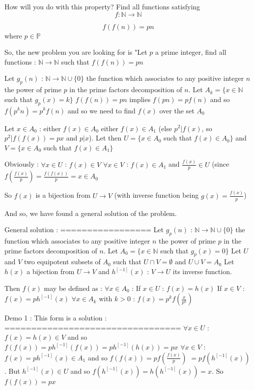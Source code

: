 \begin{solution}
	\begin{tcolorbox}How will you do with this property?
Find all functions satisfying
\[ f: \mathbb N \to \mathbb N
\]

\[ f(f(n)) = pn
\]
where $ p\in \mathbb P$\end{tcolorbox}
So, the new problem you are looking for is "Let $ p$ a prime integer, find all functions : $ \mathbb N\to\mathbb N$ such that $ f(f(n)) = pn$

Let $ g_p(n)$ : $ \mathbb N\to\mathbb N\cup\{0\}$ the function which associates to any positive integer $ n$ the power of prime $ p$ in the prime factors decomposition of $ n$.
Let $ A_k = \{x\in\mathbb N$ such that $ g_p(x) = k\}$
$ f(f(n)) = pn$ implies $ f(pn) = pf(n)$ and so $ f(p^kn) = p^kf(n)$ and so we need to find $ f(x)$ over the set $ A_0$

Let $ x\in A_0$ : either $ f(x)\in A_0$ either $ f(x)\in A_1$ (else $ p^2|f(x)$, so $ p^2|f(f(x)) = px$ and $ p|x$).
Let then $ U = \{x\in A_0$ such that $ f(x)\in A_0\}$ and $ V = \{x\in A_0$ such that $ f(x)\in A_1\}$

Obviously :
$ \forall x\in U$ : $ f(x)\in V$
$ \forall x\in V$ : $ f(x)\in A_1$ and $ \frac {f(x)}{p}\in U$ (since $ f(\frac {f(x)}{p}) = \frac {f(f(x))}{p} = x\in A_0$

So $ f(x)$ is a bijection from $ U\to V$ (with inverse function being $ g(x) = \frac {f(x)}{p}$)

And so, we have found a general solution of the problem.

General solution :
=================
Let $ g_p(n)$ : $ \mathbb N\to\mathbb N\cup\{0\}$ the function which associates to any positive integer $ n$ the power of prime $ p$ in the prime factors decomposition of $ n$.
Let $ A_0 = \{x\in\mathbb N$ such that $ g_p(x) = 0\}$
Let $ U$ and $ V$ two equipotent subsets of $ A_0$ such that $ U\cap V = \emptyset$ and $ U \cup V = A_0$
Let $ h(x)$ a bijection from $ U\to V$ and $ h^{[ - 1]}(x)$ : $ V\to U$ its inverse function.

Then $ f(x)$ may be defined as :
$ \forall x\in A_0$ : 
If $ x\in U$ : $ f(x) = h(x)$
If $ x\in V$ : $ f(x) = ph^{[ - 1]}(x)$
$ \forall x\in A_k$ with $ k > 0$ : $ f(x) = p^kf(\frac {x}{p^k})$

Demo 1 : This form is a solution :
=================================
$ \forall x\in U$ : $ f(x) = h(x)\in V$ and so $ f(f(x)) = ph^{[ - 1]}(f(x)) = ph^{[ - 1]}(h(x)) = px$
$ \forall x\in V$ : $ f(x) = ph^{[ - 1]}(x)\in A_1$ and so $ f(f(x)) = pf(\frac {f(x)}{p})$ $ = pf(h^{[ - 1]}(x))$. But $ h^{[ - 1]}(x)\in U$ and so $ f(h^{[ - 1]}(x)) = h(h^{[ - 1]}(x)) = x$. So $ f(f(x)) = px$


\end{solution}

